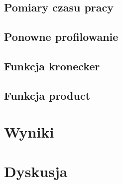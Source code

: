 \documentclass[12pt, a4paper]{article}
\begin{document}
\begin{sloppypar}
    \subsection{Pomiary czasu pracy}


    \subsection{Ponowne profilowanie}


    \subsection{Funkcja kronecker}


    \subsection{Funkcja product}


    \section{Wyniki}


    \section{Dyskusja}
  \end{sloppypar}
  \newpage
  \begin{sloppypar}
    \medskip


    \printbibliography
    [heading=bibintoc, title={Odwołania}]
  \end{sloppypar}
\end{document}

